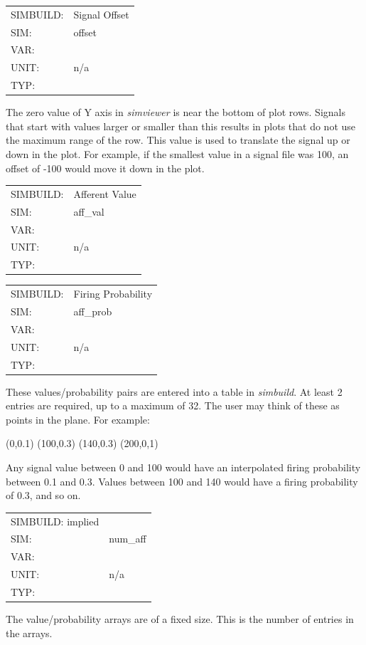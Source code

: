 \documentclass[12pt,openany,oneside]{book}
\newcommand{\prog}[1]{\textit{{#1}}}
\begin{document}
\begin{flushleft}
\begin{tabular}{@{}ll@{}}
SIMBUILD: & Signal Offset\\
SIM: & offset\\
VAR: &\\
UNIT: & n/a\\
TYP: &\\
\end{tabular}
\end{flushleft}
The zero value of Y axis in \prog{simviewer} is near the bottom of plot
rows. Signals that start with values larger or smaller than this
results in plots that do not use the maximum range of the row. This value
is used to translate the signal up or down in the plot. For example, if
the smallest value in a signal file was 100, an offset of -100 would move
it down in the plot.


\begin{flushleft}
\begin{tabular}{@{}ll@{}}
SIMBUILD: & Afferent Value\\
SIM: & aff\_val\\
VAR: &\\
UNIT: & n/a\\
TYP: &\\
\end{tabular}
\end{flushleft}

\begin{flushleft}
\begin{tabular}{@{}ll@{}}
SIMBUILD: & Firing Probability\\
SIM: & aff\_prob\\
VAR: &\\
UNIT: & n/a\\
TYP: &\\
\end{tabular}
\end{flushleft}
These values/probability pairs are entered into a table 
in \prog{simbuild}. At least 2
entries are required, up to a maximum of 32. The user may think of these
as points in the plane. For example:

(0,0.1) (100,0.3) (140,0.3) (200,0,1)

Any signal value between 0 and 100 would have an interpolated firing
probability between 0.1 and 0.3. Values between 100 and 140 would have 
a firing probability of 0.3, and so on.

\begin{flushleft}
\begin{tabular}{@{}ll@{}}
SIMBUILD: implied\\
SIM: & num\_aff\\
VAR: &\\
UNIT: & n/a\\
TYP: &\\
\end{tabular}
\end{flushleft}
The value/probability arrays are of a fixed size. This is the number of 
entries in the arrays.
\end{document}
